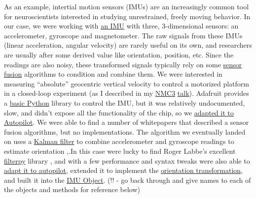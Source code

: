 \documentclass{article}
\begin{document}
As an example, intertial motion sensors (IMUs) are an increasingly
common tool for neuroscientists interested in studying unrestrained,
freely moving behavior. In our case, we were working with
\href{https://web.archive.org/web/20210127212527/https://www.sparkfun.com/products/13944}{an
IMU} with three, 3-dimensional sensors: an accelerometer, gyroscope and
magnetometer. The raw signals from these IMUs (linear acceleration,
angular velocity) are rarely useful on its own, and researchers are
usually after some derived value like orientation, position, etc. Since
the readings are also noisy, these transformed signals typically rely on
some \href{https://en.wikipedia.org/wiki/Sensor_fusion}{sensor fusion}
algorithms to condition and combine them. We were interested in
measuring ``absolute'' geocentric vertical velocity to control a
motorized platform in a closed-loop experiment (as I described in my
\href{https://neuromatch.io/abstract/?submission_id=recI5D0QaJ857Y4JI}{NMC3}
\href{https://youtu.be/l2K0l4ec0Xw}{talk}). Adafruit provides a
\href{https://github.com/adafruit/Adafruit_CircuitPython_LSM9DS1/blob/master/adafruit_lsm9ds1.py}{basic
Python} library to control the IMU, but it was relatively undocumented,
slow, and didn't expose all the functionality of the chip, so we
\href{https://web.archive.org/web/20210421223148/https://docs.auto-pi-lot.com/en/parallax/autopilot.hardware.i2c.html\#autopilot.hardware.i2c.I2C_9DOF}{adapted
it to Autopilot}. We were able to find a number of whitepapers that
described a sensor fusion algorithms, but no implementations. The
algorithm we eventually landed on uses a
\href{https://en.wikipedia.org/wiki/Kalman_filter}{Kalman filter} to
combine accelerometer and gyroscope readings to estimate orientation
\cite{abyarjooImplementingSensorFusion2015a},.In this case were
lucky to find Roger Labbe's excellent
\href{https://github.com/rlabbe/filterpy}{filterpy} library \cite{
labbeKalmanBayesianFilters2020, labbeRlabbeFilterpy2021}, and with a
few performance and syntax tweaks were also able to
\href{https://web.archive.org/web/20210421223300/https://docs.auto-pi-lot.com/en/parallax/autopilot.transform.timeseries.html\#autopilot.transform.timeseries.Kalman}{adapt
it to autopilot}, extended it to implement the
\href{https://web.archive.org/web/20210421212747/https://docs.auto-pi-lot.com/en/parallax/autopilot.transform.geometry.html}{orientation
transformation}, and built it into the
\href{https://github.com/wehr-lab/autopilot/blob/6843c0e7b6e2bfb4c35e2f7c41972336765feabd/autopilot/hardware/i2c.py\#L469-L501}{IMU
Object}. (!! - go back through and give names to each of the objects and
methods for reference below)
\end{document}
